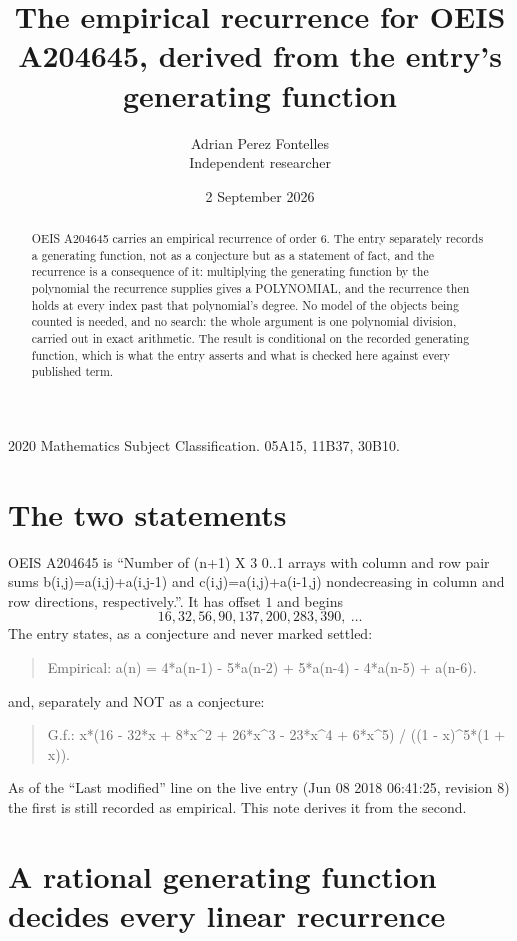 \documentclass[11pt,a4paper]{article}
\title{The empirical recurrence for OEIS A204645, derived from the entry's generating function}
\author{Adrian Perez Fontelles\\ \small Independent researcher}
\date{2 September 2026}
\theoremstyle{plain}
\theoremstyle{definition}
\begin{document}
\maketitle

\begin{abstract}
OEIS A204645 carries an empirical recurrence of order $6$. The entry separately records a
generating function, not as a conjecture but as a statement of fact, and the recurrence is a
consequence of it: multiplying the generating function by the polynomial the recurrence
supplies gives a POLYNOMIAL, and the recurrence then holds at every index past that
polynomial's degree. No model of the objects being counted is needed, and no search: the
whole argument is one polynomial division, carried out in exact arithmetic. The result is
conditional on the recorded generating function, which is what the entry asserts and what is
checked here against every published term.
\end{abstract}

\noindent\small 2020 Mathematics Subject Classification. 05A15, 11B37, 30B10.\normalsize

\section{The two statements}

OEIS A204645 is ``Number of (n+1) X 3 0..1 arrays with column and row pair sums b(i,j)=a(i,j)+a(i,j-1) and c(i,j)=a(i,j)+a(i-1,j) nondecreasing in column and row directions, respectively.''. It has offset $1$ and begins
\[
16, 32, 56, 90, 137, 200, 283, 390,\ \dots
\]
The entry states, as a conjecture and never marked settled:
\begin{quote}
Empirical: a(n) = 4*a(n-1) - 5*a(n-2) + 5*a(n-4) - 4*a(n-5) + a(n-6).
\end{quote}
and, separately and NOT as a conjecture:
\begin{quote}
G.f.: x*(16 - 32*x + 8*x\^{}2 + 26*x\^{}3 - 23*x\^{}4 + 6*x\^{}5) / ((1 - x)\^{}5*(1 + x)).
\end{quote}
As of the ``Last modified'' line on the live entry (Jun 08 2018 06:41:25, revision 8) the first is still
recorded as empirical. This note derives it from the second.

\section{A rational generating function decides every linear recurrence}
\end{document}
